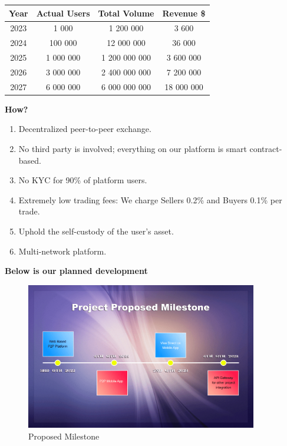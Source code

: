 \documentclass{article}
\begin{document}
\begin{table}[h]
    \centering
    \begin{tabular}{|c|c|c|c|} \hline 
         Year&  Actual Users&  Total Volume& Revenue \$\\ \hline 
         2023&  1 000&  1 200 000& 3 600\\ \hline 
         2024&  100 000&  12 000 000& 36 000\\ \hline 
         2025&  1 000 000&  1 200 000 000& 3 600 000\\ \hline 
         2026&  3 000 000&  2 400 000 000& 7 200 000\\ \hline 
         2027&  6 000 000&  6 000 000 000& 18 000 000\\ \hline
    \end{tabular}
    
    
\end{table}

\textbf{How?}

\begin{enumerate}
    \item Decentralized peer-to-peer exchange.
    \item No third party is involved; everything on our platform is smart contract-based.
    \item No KYC for 90\% of platform users.
    \item Extremely low trading fees: We charge Sellers 0.2\% and Buyers 0.1\% per trade.
    \item Uphold the self-custody of the user's asset.
    \item Multi-network platform.
\end{enumerate}

\textbf{Below is our planned development}

\begin{figure}[h]
  \begin{center}
    \centering
    \includegraphics[width=0.9\textwidth]{fig/planned_dev.png}
    \caption[Fig 1]{Proposed Milestone\label{fig:poh_insert}}
  \end{center}
\end{figure}
\end{document}
